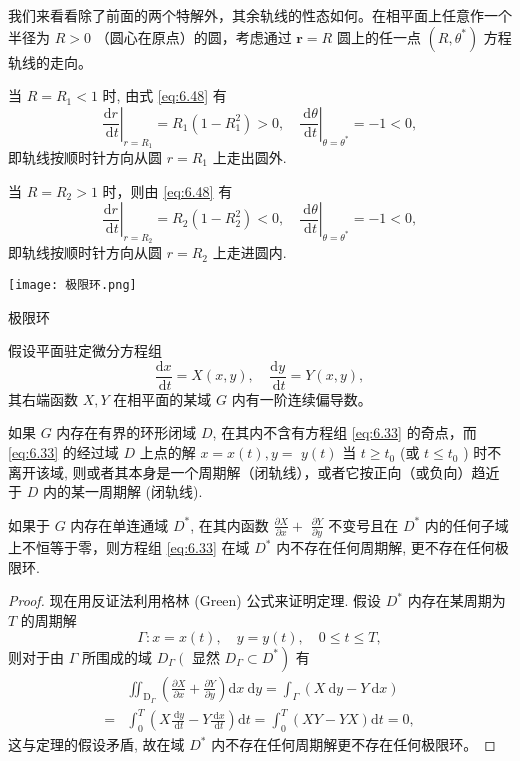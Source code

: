我们来看看除了前面的两个特解外，其余轨线的性态如何。在相平面上任意作一个半径为 $R>0$ （圆心在原点）的圆，考虑通过 $\boldsymbol{r}=R$ 圆上的任一点 $\left(R, \theta^*\right)$ 方程轨线的走向。

当 $R=R_1<1$ 时, 由式 \eqref{eq:6.48} 有
$$
    \left.\frac{\mathrm{d} r}{\mathrm{~d} t}\right|_{r=R_1}=R_1\left(1-R_1^2\right)>0,\left.\quad \frac{\mathrm{~d} \theta}{\mathrm{~d} t}\right|_{\theta=\theta^*}=-1<0,
$$
即轨线按顺时针方向从圆 $r=R_1$ 上走出圆外.

当 $R=R_2>1$ 时，则由 \eqref{eq:6.48} 有
$$
    \left.\frac{\mathrm{d} r}{\mathrm{~d} t}\right|_{r=R_2}=R_2\left(1-R_2^2\right)<0,\left.\quad \frac{\mathrm{~d} \theta}{\mathrm{~d} t}\right|_{\theta=\theta^*}=-1<0,
$$
即轨线按顺时针方向从圆 $r=R_2$ 上走进圆内.
\begin{marginfigure}
    \centering
    \texttt{[image: 极限环.png]}
    \caption{极限环}
    \label{fig:极限环}
\end{marginfigure}

假设平面驻定微分方程组
\begin{equation}\label{eq:6.33}
    \frac{\mathrm{d} x}{\mathrm{~d} t}=X(x, y), \quad \frac{\mathrm{d} y}{\mathrm{~d} t}=Y(x, y),
\end{equation}
其右端函数 $X, Y$ 在相平面的某域 $G$ 内有一阶连续偏导数。
\begin{theorem}
    如果 $G$ 内存在有界的环形闭域 $D$, 在其内不含有方程组 \eqref{eq:6.33} 的奇点，而 \eqref{eq:6.33} 的经过域 $D$ 上点的解 $x=x(t), y=$ $y(t)$ 当 $t \geqslant t_0$ (或 $t \leqslant t_0$ ) 时不离开该域, 则或者其本身是一个周期解（闭轨线），或者它按正向（或负向）趋近于 $D$ 内的某一周期解 (闭轨线).
\end{theorem}

\begin{theorem}[极限环的存在性]\label{theorem:limit_cycle_existence}
    如果于 $G$ 内存在单连通域 $D^*$, 在其内函数 $\frac{\partial X}{\partial x}+$ $\frac{\partial Y}{\partial y}$ 不变号且在 $D^*$ 内的任何子域上不恒等于零，则方程组 \eqref{eq:6.33} 在域 $D^*$ 内不存在任何周期解, 更不存在任何极限环.
\end{theorem}
\begin{proof}
    现在用反证法利用格林 (Green) 公式来证明定理. 假设 $D^*$ 内存在某周期为 $T$ 的周期解
    $$
        \Gamma: x=x(t), \quad y=y(t), \quad 0 \leqslant t \leqslant T,
    $$
    则对于由 $\Gamma$ 所围成的域 $D_{\Gamma}\left(\right.$ 显然 $\left.D_{\Gamma} \subset D^*\right)$ 有
    $$
        \begin{aligned}
              & \iint_{\mathrm{D}_{\Gamma}}\left(\frac{\partial X}{\partial x}+\frac{\partial Y}{\partial y}\right) \mathrm{d} x \mathrm{~d} y=\int_{\Gamma}(X \mathrm{~d} y-Y \mathrm{~d} x) \\
            = & \int_0^T\left(X \frac{\mathrm{~d} y}{\mathrm{~d} t}-Y \frac{\mathrm{~d} x}{\mathrm{~d} t}\right) \mathrm{d} t=\int_0^T(X Y-Y X) \mathrm{d} t=0,
        \end{aligned}
    $$
    这与定理的假设矛盾, 故在域 $D^*$ 内不存在任何周期解更不存在任何极限环。
\end{proof}

